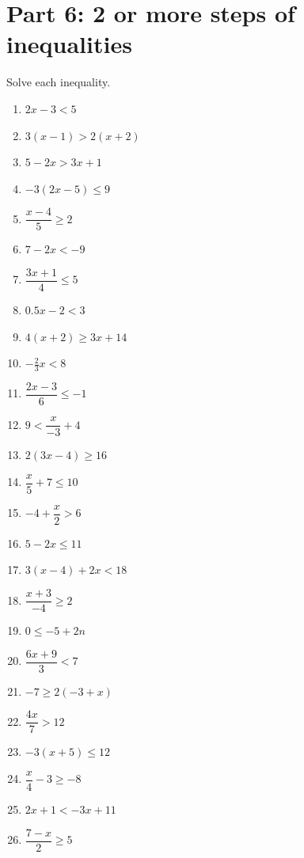 \documentclass[10pt]{article}
\theoremstyle{definition}
\theoremstyle{plain}
\numberwithin{equation}{section}
\begin{document}
\newpage
\section*{Part 6: 2 or more steps of inequalities}
\begin{multicolblock}{Solve each inequality.}
\begin{enumerate}
  \item $2x - 3 < 5$
  \item $3(x - 1) > 2(x + 2)$
  \item $5 - 2x > 3x + 1$
  \item $-3(2x - 5) \le 9$
  \item $\dfrac{x - 4}{5} \ge 2$
  \item $7 - 2x < -9$
  \item $\dfrac{3x + 1}{4} \le 5$
  \item $0.5x - 2 < 3$
  \item $4(x + 2) \ge 3x + 14$
  \item $-\tfrac{2}{3}x < 8$
  \item $\dfrac{2x - 3}{6} \le -1$
  \item $9 < \dfrac{x}{-3} + 4$
  \item $2(3x - 4) \ge 16$
  \item $\dfrac{x}{5} + 7 \le 10$
  \item $-4 + \dfrac{x}{2} > 6$
  \item $5 - 2x \le 11$
  \item $3(x - 4) + 2x < 18$
  \item $\dfrac{x + 3}{-4} \ge 2$
  \item $0 \le -5 + 2n$
  \item $\dfrac{6x + 9}{3} < 7$
  \item $-7 \ge 2(-3 + x)$
  \item $\dfrac{4x}{7} > 12$
  \item $-3(x + 5) \le 12$
  \item $\dfrac{x}{4} - 3 \ge -8$
  \item $2x + 1 < -3x + 11$
  \item $\dfrac{7 - x}{2} \ge 5$
\end{enumerate}
\end{multicolblock}
\end{document}
